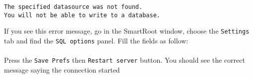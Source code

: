 \begin{Verbatim}[frame=single, commandchars=+\(\)]
The specified datasource was not found.
You will not be able to write to a database.
\end{Verbatim}

\noindent
If you see this error message, go in the SmartRoot window, choose the \verb|Settings| tab and find the \verb|SQL options| panel. Fill the fields as follow:\\

\noindent
{}\\
	
\noindent
Press the \verb|Save Prefs| then \verb|Restart server| button. You should see the correct message saying the connection started






